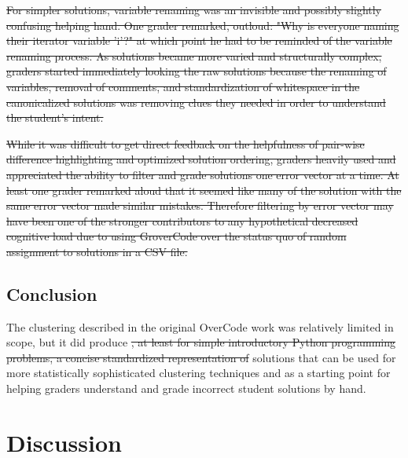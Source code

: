 \documentclass[12pt,twoside]{mitthesis}
\providecommand{\DIFaddtex}[1]{{\protect\color{blue}\uwave{#1}}} %
\providecommand{\DIFdeltex}[1]{{\protect\color{red}\sout{#1}}}                      %
\providecommand{\DIFaddbegin}{} %
\providecommand{\DIFaddend}{} %
\providecommand{\DIFdelbegin}{} %
\providecommand{\DIFdelend}{} %
\providecommand{\DIFadd}[1]{\texorpdfstring{\DIFaddtex{#1}}{#1}} %
\providecommand{\DIFdel}[1]{\texorpdfstring{\DIFdeltex{#1}}{}} %
\begin{document}
{{{{{{{{{{%
\DIFdel{For simpler solutions, variable renaming was an invisible and possibly slightly confusing helping hand. One grader remarked, outloud: "Why is everyone naming their iterator variable 'i'?" at which point he had to be reminded of the variable renaming process. As solutions became more varied and structurally complex, graders started immediately looking the raw solutions because the renaming of variables, removal of comments, and standardization of whitespace in the canonicalized solutions was removing clues they needed in order to understand the student's intent.
}%

\DIFdel{While it was difficult to get direct feedback on the helpfulness of pair-wise difference highlighting and optimized solution ordering, graders heavily used and appreciated the ability to filter and grade solutions one error vector at a time. At least one grader remarked aloud that it seemed like many of the solution with the same error vector made similar mistakes. Therefore filtering by error vector may have been one of the stronger contributors to any hypothetical decreased cognitive load due to using GroverCode over the status quo of random assignment to solutions in a CSV file.
}%


\DIFdelend \section{Conclusion}
The clustering described in the original OverCode work was relatively limited in scope, but it did produce \DIFdelbegin \DIFdel{, at least for simple introductory Python programming problems, a concise standardized representation of }\DIFdelend \DIFaddbegin \DIFadd{platonic }\DIFaddend solutions that can be used for more statistically sophisticated clustering techniques and as a starting point for helping graders understand and grade incorrect student solutions by hand.


\chapter{Discussion}\label{chapter:discussion}

}}}}}}}}}}
\end{document}
